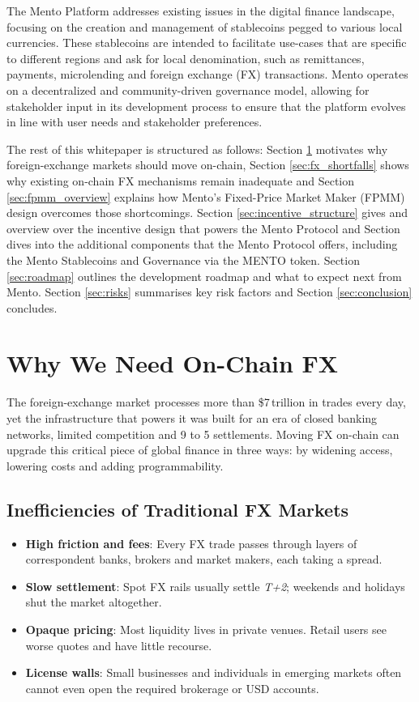 \documentclass[a4paper]{article}
\providecommand{\hyp}{-}
\theoremstyle{definition}
\begin{document}
The Mento Platform addresses existing issues in the digital finance landscape, focusing on the creation and management of stablecoins pegged to various local currencies. These stablecoins are intended to facilitate use-cases that are specific to different regions and ask for local denomination, such as remittances, payments, microlending and foreign exchange (FX) transactions. Mento operates on a decentralized and community-driven governance model, allowing for stakeholder input in its development process to ensure that the platform evolves in line with user needs and stakeholder preferences.

The rest of this whitepaper is structured as follows: Section \ref{sec:need_for_mento} motivates why foreign-exchange markets should move on-chain, Section \ref{sec:fx_shortfalls} shows why existing on-chain FX mechanisms remain inadequate and Section \ref{sec:fpmm_overview} explains how Mento's Fixed\hyp Price Market Maker (FPMM) design overcomes those shortcomings. Section \ref{sec:incentive_structure} gives and overview over the incentive design that powers the Mento Protocol and Section \label{sec:additional_components} dives into the additional components that the Mento Protocol offers, including the Mento Stablecoins and Governance via the MENTO token. Section \ref{sec:roadmap} outlines the development roadmap and what to expect next from Mento.  Section \ref{sec:risks} summarises key risk factors and Section \ref{sec:conclusion} concludes.

\section{Why We Need On\hyp Chain FX}
\label{sec:need_for_mento}

The foreign\hyp exchange market processes more than \$7\,trillion in trades every day\cite{bis_fx_survey_2022}, yet the infrastructure that powers it was built for an era of closed banking networks, limited competition and 9\,\,to\,\,5 settlements.  Moving FX on\hyp chain can upgrade this critical piece of global finance in three ways: by widening access, lowering costs and adding programmability.

\subsection{Inefficiencies of Traditional FX Markets}
\begin{itemize}[leftmargin=*]
  \item \textbf{High friction and fees}: Every FX trade passes through layers of correspondent banks, brokers and market makers, each taking a spread.
  \item \textbf{Slow settlement}: Spot FX rails usually settle \emph{T+2}; weekends and holidays shut the market altogether.
  \item \textbf{Opaque pricing}: Most liquidity lives in private venues.  Retail users see worse quotes and have little recourse.
  \item \textbf{License walls}: Small businesses and individuals in emerging markets often cannot even open the required brokerage or USD accounts.
\end{itemize}
\end{document}
